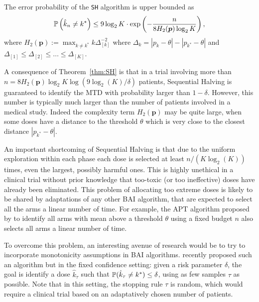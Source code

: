 \begin{theorem}\label{thm:SH}
The error probability of the \texttt{SH} algorithm is upper bounded as 
\begin{align*}
  \mathbb{P}\left(\hat{k}_n \neq k^*\right) \leq 9 \log_2 K \cdot \exp \left(
  - \frac{n}{8 H_2 (\bm p)\log_2 K}
  \right),
\end{align*}
where $H_2(\bm p):= \max_{k \ne k^*} {k}{\Delta_{[k]}^{-2}}$ where $\Delta_k = |p_k - \theta| - |p_{k^*} - \theta|$ and $\Delta_{[1]} \leq \Delta_{[2]} \leq \dots \leq \Delta_{[K]}$.
\end{theorem}
A consequence of Theorem~\ref{thm:SH} is that in a trial involving more than $n = 8 H_2(\bm p) \log_2 K\log\left(9\log_2(K)/\delta\right)$ patients, Sequential Halving is guaranteed to identify the MTD with probability larger than $1-\delta$. However, this number is typically much larger than the number of patients involved in a medical study. Indeed the complexity term $H_2(\bm p)$ may be quite large, when some doses have a distance to the threshold $\theta$ which is very close to the closest distance $|p_{k^*} - \theta|$. 

An important shortcoming of Sequential Halving is that due to the uniform exploration within each phase each dose is selected at least $n / (K\log_2(K))$ times, even the largest, possibly harmful ones. This is highly unethical in a  clinical trial without prior knowledge that too-toxic (or too ineffective) doses have already been eliminated. This problem of allocating too extreme doses is likely to be shared by adaptations of any other BAI algorithm, that are expected to select all the arms a linear number of time. For example, the APT algorithm proposed by \cite{Locatelli16Thres} to identify all arms with mean above a threshold $\theta$ using a fixed budget $n$ also selects all arms a linear number of time.

To overcome this problem, an interesting avenue of research would be to try to incorporate monotonicity assumptions in BAI algorithms. \cite{Garivier17DF} recently proposed such an algorithm but in the fixed confidence setting: given a risk parameter $\delta$, the goal is identify a dose $\hat{k}_\tau$  such that $\mathbb{P}(\hat{k}_\tau \neq k^*) \leq \delta$, using as few samples $\tau$ as possible. Note that in this setting, the stopping rule $\tau$ is random, which would require a clinical trial based on an adaptatively chosen number of patients.


